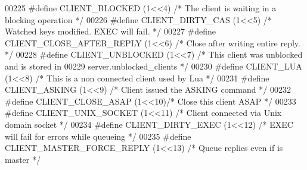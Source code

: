 \begin{DoxyCode}
{{{{{{00225 \textcolor{preprocessor}{#}\textcolor{preprocessor}{define} \textcolor{preprocessor}{CLIENT\_BLOCKED} \textcolor{preprocessor}{(}1\textcolor{preprocessor}{<<}4\textcolor{preprocessor}{)} \textcolor{comment}{/* The client is waiting in a blocking operation */}
00226 \textcolor{preprocessor}{#}\textcolor{preprocessor}{define} \textcolor{preprocessor}{CLIENT\_DIRTY\_CAS} \textcolor{preprocessor}{(}1\textcolor{preprocessor}{<<}5\textcolor{preprocessor}{)} \textcolor{comment}{/* Watched keys modified. EXEC will fail. */}
00227 \textcolor{preprocessor}{#}\textcolor{preprocessor}{define} \textcolor{preprocessor}{CLIENT\_CLOSE\_AFTER\_REPLY} \textcolor{preprocessor}{(}1\textcolor{preprocessor}{<<}6\textcolor{preprocessor}{)} \textcolor{comment}{/* Close after writing entire reply. */}
00228 \textcolor{preprocessor}{#}\textcolor{preprocessor}{define} \textcolor{preprocessor}{CLIENT\_UNBLOCKED} \textcolor{preprocessor}{(}1\textcolor{preprocessor}{<<}7\textcolor{preprocessor}{)} \textcolor{comment}{/* This client was unblocked and is stored in}
00229 \textcolor{comment}{                                  server.unblocked\_clients */}
00230 \textcolor{preprocessor}{#}\textcolor{preprocessor}{define} \textcolor{preprocessor}{CLIENT\_LUA} \textcolor{preprocessor}{(}1\textcolor{preprocessor}{<<}8\textcolor{preprocessor}{)} \textcolor{comment}{/* This is a non connected client used by Lua */}
00231 \textcolor{preprocessor}{#}\textcolor{preprocessor}{define} \textcolor{preprocessor}{CLIENT\_ASKING} \textcolor{preprocessor}{(}1\textcolor{preprocessor}{<<}9\textcolor{preprocessor}{)}     \textcolor{comment}{/* Client issued the ASKING command */}
00232 \textcolor{preprocessor}{#}\textcolor{preprocessor}{define} \textcolor{preprocessor}{CLIENT\_CLOSE\_ASAP} \textcolor{preprocessor}{(}1\textcolor{preprocessor}{<<}10\textcolor{preprocessor}{)}\textcolor{comment}{/* Close this client ASAP */}
00233 \textcolor{preprocessor}{#}\textcolor{preprocessor}{define} \textcolor{preprocessor}{CLIENT\_UNIX\_SOCKET} \textcolor{preprocessor}{(}1\textcolor{preprocessor}{<<}11\textcolor{preprocessor}{)} \textcolor{comment}{/* Client connected via Unix domain socket */}
00234 \textcolor{preprocessor}{#}\textcolor{preprocessor}{define} \textcolor{preprocessor}{CLIENT\_DIRTY\_EXEC} \textcolor{preprocessor}{(}1\textcolor{preprocessor}{<<}12\textcolor{preprocessor}{)}  \textcolor{comment}{/* EXEC will fail for errors while queueing */}
00235 \textcolor{preprocessor}{#}\textcolor{preprocessor}{define} \textcolor{preprocessor}{CLIENT\_MASTER\_FORCE\_REPLY} \textcolor{preprocessor}{(}1\textcolor{preprocessor}{<<}13\textcolor{preprocessor}{)}  \textcolor{comment}{/* Queue replies even if is master */}
}}}}}}
\end{DoxyCode}
